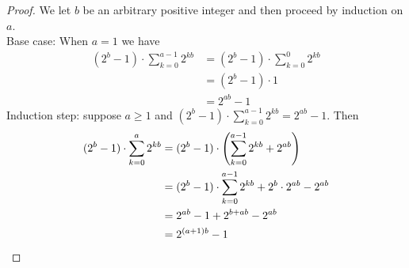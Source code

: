 \documentclass{report}
\theoremstyle{definition}
\begin{document}
\begin{proof}
We let $b$ be an arbitrary positive integer and then proceed by induction on $a$.\\
\indent Base case: When $a=1$ we have
\begin{align*}
(2^b-1)\cdot\sum^{a-1}_{k=0}2^{kb}&=(2^b-1)\cdot\sum^{0}_{k=0}2^{kb}\\
&=(2^b-1)\cdot1\\
&=2^{ab}-1
\end{align*}
\indent Induction step: suppose $a\geq1$ and $(2^b-1)\cdot\sum^{a-1}_{k=0}2^{kb}=2^{ab}-1$. Then
\begin{align*}
(2^b-1)\cdot\sum^{a}_{k=0}2^{kb}&=(2^b-1)\cdot\left(\sum^{a-1}_{k=0}2^{kb}+2^{ab}\right)\\
&=(2^b-1)\cdot\sum^{a-1}_{k=0}2^{kb}+2^b\cdot2^{ab}-2^{ab}\\
&=2^{ab}-1+2^{b+ab}-2^{ab}\\
&=2^{(a+1)b}-1\qedhere
\end{align*}
\end{proof}
\newpage
\end{document}
